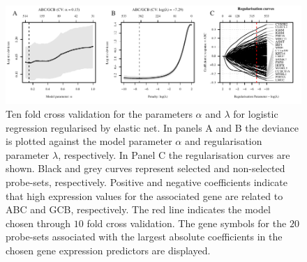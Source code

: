 \documentclass{article}
\begin{document}
\setcounter{figure}{0}
\setcounter{table}{0}

\begin{figure}[htb]
\begin{center}
\includegraphics[width=1\textwidth]{figures/CrosvalidationClass.pdf}
\end{center}
\caption{Ten fold cross validation for the parameters $\alpha$ and $\lambda$ for logistic regression regularised by elastic net.
In panels A and B the deviance is plotted against the model parameter $\alpha$ and regularisation parameter $\lambda$, respectively.
In Panel C the regularisation curves are shown.
Black and grey curves represent selected and non-selected probe-sets, respectively.
Positive and negative coefficients indicate that high expression values for the associated gene are related to ABC and GCB, respectively.
The red line indicates the model chosen through $10$ fold cross validation.
The gene symbols for the $20$ probe-sets associated with the largest absolute coefficients in the chosen gene expression predictors are displayed.}
\label{fig:crossval}
\end{figure}






\newpage
\listoftodos


\cleardoublepage

\renewcommand{\theequation}{S\arabic{equation}}
\renewcommand{\thefigure}{S\arabic{figure}}
\renewcommand{\thesection}{\arabic{section}}

\setcounter{section}{0}
\setcounter{subsection}{0}
\setcounter{equation}{0}
\setcounter{figure}{0}
\setcounter{table}{0}
\setcounter{page}{1}



\end{document}
